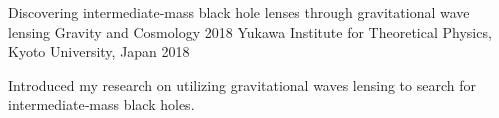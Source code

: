 \begin{cventries}
%
  \cventry
    {Discovering intermediate‑mass black hole lenses through gravitational wave lensing} %
    {Gravity and Cosmology 2018} %
    {Yukawa Institute for Theoretical Physics, Kyoto University, Japan} %
    {2018} %
    {
      \begin{cvitems} %
        \item {Introduced my research on utilizing gravitational waves lensing to search for intermediate‑mass black holes.}
      \end{cvitems}
    }

%
\end{cventries}
